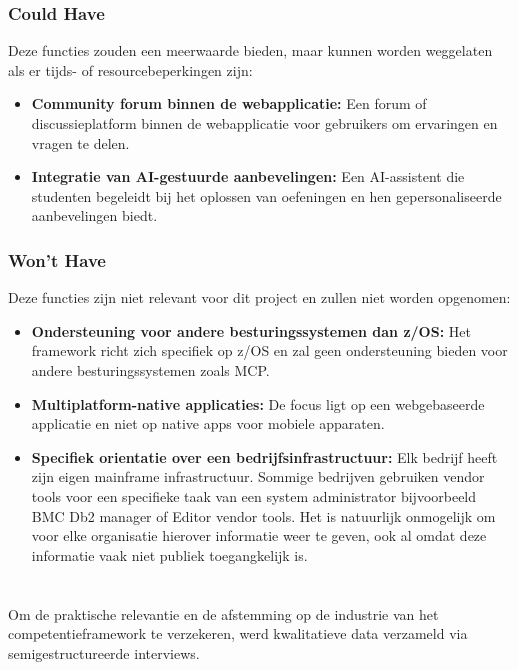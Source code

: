 \subsubsection{Could Have}
Deze functies zouden een meerwaarde bieden, maar kunnen worden weggelaten als er tijds- of resourcebeperkingen zijn:
\begin{itemize}
    \item \textbf{Community forum binnen de webapplicatie:} Een forum of discussieplatform binnen de webapplicatie voor gebruikers om ervaringen en vragen te delen.
    \item \textbf{Integratie van AI-gestuurde aanbevelingen:} Een AI-assistent die studenten begeleidt bij
    het oplossen van oefeningen en hen gepersonaliseerde aanbevelingen biedt.
\end{itemize}
\subsubsection{Won't Have}
Deze functies zijn niet relevant voor dit project en zullen niet worden opgenomen:
\begin{itemize}
	 \item \textbf{Ondersteuning voor andere besturingssystemen dan z/OS:} Het framework richt zich specifiek op z/OS en zal geen ondersteuning bieden voor andere besturingssystemen zoals MCP.
    \item \textbf{Multiplatform-native applicaties:} De focus ligt op een webgebaseerde applicatie en niet op native apps voor mobiele apparaten.
    \item \textbf{Specifiek orientatie over een bedrijfsinfrastructuur:} Elk bedrijf heeft zijn eigen mainframe infrastructuur. Sommige bedrijven gebruiken vendor tools voor een specifieke taak van een system administrator bijvoorbeeld BMC Db2 manager of Editor vendor tools. Het is natuurlijk onmogelijk om voor elke organisatie hierover informatie weer te geven, ook al omdat deze informatie vaak niet publiek toegangkelijk is.
\end{itemize}
\section{}%
\label{sec:onderzoek-interview-prof}

Om de praktische relevantie en de afstemming op de industrie van het competentieframework te verzekeren, werd kwalitatieve data verzameld via semigestructureerde interviews.

